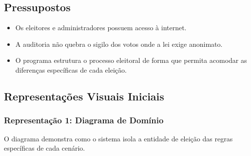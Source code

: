 \documentclass[12pt,a4paper]{article}
\begin{document}
\subsection{Pressupostos}
\begin{itemize}
    \item Os eleitores e administradores possuem acesso à internet.
    \item A auditoria não quebra o sigilo dos votos onde a lei exige anonimato.
    \item O programa estrutura o processo eleitoral de forma que permita acomodar as diferenças específicas de cada eleição.
\end{itemize}

\subsection{Representações Visuais Iniciais}

\subsubsection*{Representação 1: Diagrama de Domínio}
O diagrama demonstra como o sistema isola a entidade de eleição das regras específicas de cada cenário.
\end{document}

